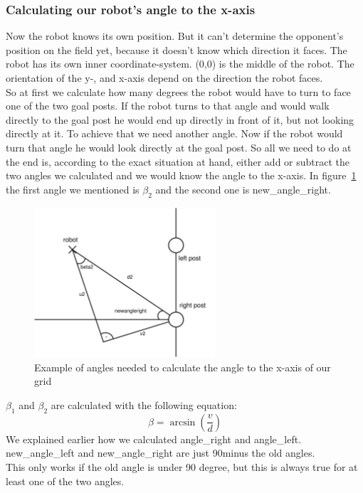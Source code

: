 \documentclass[lnicst,a4paper]{svmultln}
\begin{document}
\subsubsection{Calculating our robot's angle to the x-axis}
Now the robot knows its own position. But it can't determine the opponent's position on the field yet, because it doesn't know which direction it faces. The robot has its own inner coordinate-system. (0,0) is the middle of the robot. The orientation of the y-, and x-axis depend on the direction the robot faces.\\
So at first we calculate how many degrees the robot would have to turn to face one of the two goal posts. If the robot turns to that angle and would walk directly to the goal post he would end up directly in front of it, but not looking directly at it. To achieve that we need another angle. Now if the robot would turn that angle he would look directly at the goal post. So all we need to do at the end is, according to the exact situation at hand, either add or subtract the two angles we calculated and we would know the angle to the x-axis.
In figure~\ref{fig:angles} the first angle we mentioned is \(\beta_{2}\) and the second one is new\_angle\_right.
\begin{figure}
 	\centerline{\includegraphics[width=0.6\textwidth]{angles.pdf}}
	{\caption{Example of angles needed to calculate the angle to the x-axis of our grid}\label{fig:angles}}
\end{figure}
\(\beta_{1}\) and \(\beta_{2}\) are calculated with the following equation:
\begin{equation}
	\beta = \arcsin{(\frac{v}{d})}
\end{equation}
We explained earlier how we calculated angle\_right and angle\_left. new\_angle\_left and new\_angle\_right are just 90\degree minus the old angles. 
\\
This only works if the old angle is under 90 degree, but this is always true for at least one of the two angles.
\end{document}
